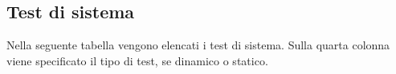 \documentclass[a4paper,11pt]{article}
\begin{document}
\begin{longtable}{p{}p{}p{}p{}}
			
\end{longtable}

\subsection{Test di sistema}
Nella seguente tabella vengono elencati i test di sistema. Sulla quarta colonna viene specificato il tipo di test, se dinamico o statico.
\end{document}
